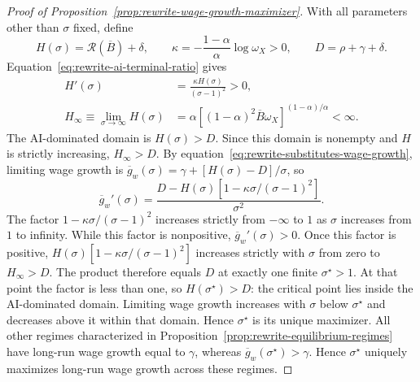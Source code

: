 \label{proof:rewrite-wage-growth-maximizer}
\begin{proof}[Proof of Proposition~\ref{prop:rewrite-wage-growth-maximizer}]
With all parameters other than $\sigma$ fixed, define
\[
 H(\sigma)=\mathcal R(\overline B)+\delta,\qquad
 \kappa=-\frac{1-\alpha}{\alpha}\log\omega_X>0,\qquad
 D=\rho+\gamma+\delta.
\]
Equation~\eqref{eq:rewrite-ai-terminal-ratio} gives
\[
 \begin{aligned}
 H'(\sigma)&=\frac{\kappa H(\sigma)}{(\sigma-1)^2}>0,\\
 H_\infty\equiv\lim_{\sigma\to\infty}H(\sigma)
 &=\alpha\left[(1-\alpha)^2\overline B\omega_X\right]^{(1-\alpha)/\alpha}
 <\infty.
 \end{aligned}
\]
The AI-dominated domain is $H(\sigma)>D$. Since this domain is nonempty
and $H$ is strictly increasing, $H_\infty>D$.
By equation~\eqref{eq:rewrite-substitutes-wage-growth}, limiting wage growth
is $\overline g_w(\sigma)=\gamma+[H(\sigma)-D]/\sigma$, so
\[
 \overline g_w'(\sigma)
 =\frac{D-H(\sigma)\left[1-\kappa\sigma/(\sigma-1)^2\right]}{\sigma^2}.
\]
The factor $1-\kappa\sigma/(\sigma-1)^2$ increases strictly from $-\infty$ to $1$ as
$\sigma$ increases from $1$ to infinity. While this factor is nonpositive,
$\overline g_w'(\sigma)>0$. Once this factor is positive,
$H(\sigma)[1-\kappa\sigma/(\sigma-1)^2]$ increases strictly with $\sigma$
from zero to $H_\infty>D$. The product
therefore equals $D$ at exactly one finite $\sigma^\star>1$.
At that point the factor is less than one, so $H(\sigma^\star)>D$:
the critical point lies inside the AI-dominated domain.
Limiting wage growth increases with $\sigma$ below $\sigma^\star$ and decreases above it
within that domain. Hence $\sigma^\star$ is its unique maximizer.
All other regimes characterized in
Proposition~\ref{prop:rewrite-equilibrium-regimes} have long-run wage growth
equal to $\gamma$, whereas $\overline g_w(\sigma^\star)>\gamma$.
Hence $\sigma^\star$ uniquely maximizes long-run wage growth across these
regimes.
\end{proof}

